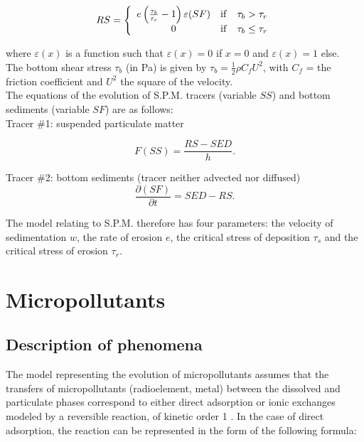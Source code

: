 \begin{equation}
  RS = \left\{
    \begin{array}{ccl}
      e \left( \frac{\tau_b}{\tau_r} -1 \right) \varepsilon(SF) & \rm{if} & \tau_b > \tau_r\\
      0 & \rm{if} & \tau_b \le \tau_r
    \end{array}
    \right .
\end{equation}

where $\varepsilon(x)$ is a function such that $\varepsilon(x) = 0$
if $x = 0$ and $\varepsilon(x) = 1$ else.\\

The bottom shear stress $\tau_b$ (in Pa) is given by $\tau_b = \frac{1}{2} \rho C_f U^2$,
with $C_f$ = the friction coefficient and $U^2$ the square of the velocity.\\

The equations of the evolution of S.P.M. tracers (variable $SS$)
and bottom sediments (variable $SF$) are as follows:\\

Tracer $\#$1: suspended particulate matter

\begin{equation}
  F(SS) = \frac{RS-SED}{h}.
\end{equation}

Tracer $\#$2: bottom sediments (tracer neither advected nor diffused)\\

\begin{equation}
  \frac{\partial (SF)}{\partial t} = SED - RS.
\end{equation}

The model relating to S.P.M. therefore has four parameters: the velocity of sedimentation $w$,
the rate of erosion $e$, the critical stress of deposition $\tau_s$
and the critical stress of erosion $\tau_r$.

\section{Micropollutants}

\subsection{Description of phenomena}

The model representing the evolution of micropollutants assumes
that the transfers of micropollutants (radioelement, metal)
between the dissolved and particulate phases correspond to either
direct adsorption or ionic exchanges modeled by a reversible reaction,
of kinetic order 1 \cite{ciffroy_doubs_1995}.
In the case of direct adsorption, the reaction can be represented in the form of the following formula:\\

